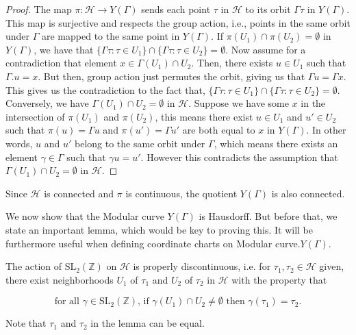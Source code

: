 \begin{proof}
The map \(\pi: \mathcal{H} \longrightarrow Y(\Gamma)\) sends each point \(\tau\) in \(\mathcal{H}\) to its orbit \(\Gamma \tau\) in \(Y(\Gamma)\). This map is surjective and respects the group action, i.e., points in the same orbit under \(\Gamma\) are mapped to the same point in \(Y(\Gamma)\).   If \(\pi(U_{1}) \cap \pi(U_{2}) = \emptyset\) in \(Y(\Gamma)\), we have that $\{\Gamma \tau: \tau \in U_1\}\cap\{\Gamma \tau: \tau \in U_2\}=\emptyset$.
Now assume for a contradiction that element $x \in \Gamma\left(U_{1}\right) \cap U_{2}$. Then, there exists $u \in U_1$ such that $\Gamma.u=x$. But then, group action just permutes the orbit, giving us that $\Gamma u=\Gamma x$. This gives us the contradiction to the fact that, $\{\Gamma \tau: \tau \in U_1\}\cap\{\Gamma \tau: \tau \in U_2\}=\emptyset$. \\
Conversely, we have \(\Gamma(U_{1}) \cap U_{2} = \emptyset\) in \(\mathcal{H}\). Suppose we have some \( x \) in the intersection of \( \pi(U_1) \) and \( \pi(U_2) \), this means there exist \( u \in U_1 \) and \( u' \in U_2 \) such that \( \pi(u) = \Gamma u \) and \( \pi(u') = \Gamma u' \) are both equal to \( x \) in \( Y(\Gamma) \). In other words, \( u \) and \( u' \) belong to the same orbit under \( \Gamma \), which means there exists an element \( \gamma \in \Gamma \) such that \( \gamma u = u' \). However this contradicts the assumption that \( \Gamma(U_1) \cap U_2 = \emptyset \) in \( \mathcal{H} \).  

\end{proof}


Since $\mathcal{H}$ is connected and $\pi$ is continuous, the quotient $Y(\Gamma)$ is also connected.

We now show that the Modular curve $Y(\Gamma)$ is Hausdorff. But before that, we state an important lemma, which would be key to proving this. It will be furthermore useful when defining coordinate charts on Modular curve.$Y(\Gamma)$.

\begin{lemma}\label{4.1.7}
    The action of $\mathrm{SL}_{2}(\mathbb{Z})$ on $\mathcal{H}$ is properly discontinuous, i.e. for $\tau_{1}, \tau_{2} \in \mathcal{H}$ given, there exist neighborhoods $U_{1}$ of $\tau_{1}$ and $U_{2}$ of $\tau_{2}$ in $\mathcal{H}$ with the property that

$$
\text { for all } \gamma \in \mathrm{SL}_{2}(\mathbb{Z}) \text {, if } \gamma\left(U_{1}\right) \cap U_{2} \neq \emptyset \text { then } \gamma\left(\tau_{1}\right)=\tau_{2} \text {. }
$$

Note that $\tau_{1}$ and $\tau_{2}$ in the lemma can be equal.

\end{lemma}


